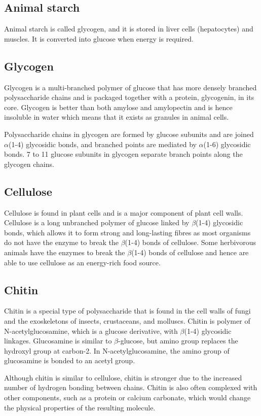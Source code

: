 \documentclass[11pt]{article}
\begin{document}
\subsection{Animal starch}
\label{sec:org90d6837}
Animal starch is called glycogen, and it is stored in liver cells (hepatocytes) and muscles. It is converted into glucose when energy is required.
\subsection{Glycogen}
\label{sec:orgaa32bca}
Glycogen is a multi-branched polymer of glucose that has more densely branched polysaccharide chains and is packaged together with a protein, glycogenin, in its core. Glycogen is better than both amylose and amylopectin and is hence insoluble in water which means that it exists as granules in animal cells.


Polysaccharide chains in glycogen are formed by glucose subunits and are joined \(\alpha\)(1-4) glycosidic bonds, and branched points are mediated by \(\alpha\)(1-6) glycosidic bonds. 7 to 11 glucose subunits in glycogen separate branch points along the glycogen chains.
\subsection{Cellulose}
\label{sec:orgc646f1f}
Cellulose is found in plant cells and is a major component of plant cell walls. Cellulose is a long unbranched polymer of glucose linked by \(\beta\)(1-4) glycosidic bonds, which allows it to form strong and long-lasting fibres as most organisms do not have the enzyme to break the \(\beta\)(1-4) bonds of cellulose. Some herbivorous animals have the enzymes to break the \(\beta\)(1-4) bonds of cellulose and hence are able to use cellulose as an energy-rich food source.
\subsection{Chitin}
\label{sec:orgdc09c91}
Chitin is a special type of polysaccharide that is found in the cell walls of fungi and the exoskeletons of insects, crustaceans, and molluscs. Chitin is polymer of N-acetylglucosamine, which is a glucose derivative, with \(\beta\)(1-4) glycosidic linkages. Glucosamine is similar to \(\beta\)-glucose, but amino group replaces the hydroxyl group at carbon-2. In N-acetylglucosamine, the amino group of glucosamine is bonded to an acetyl group.


Although chitin is similar to cellulose, chitin is stronger due to the increased number of hydrogen bonding between chains. Chitin is also often complexed with other components, such as a protein or calcium carbonate, which would change the physical properties of the resulting molecule.
\end{document}
